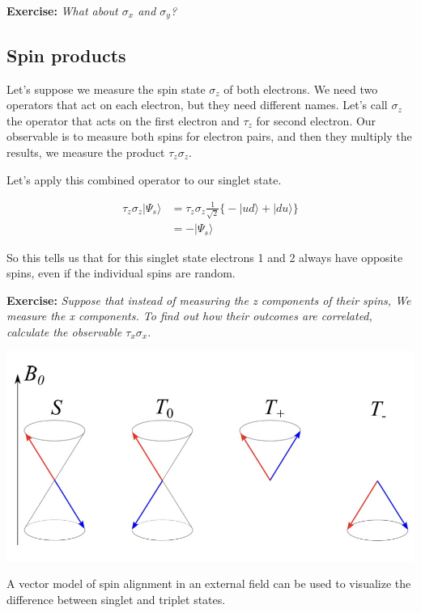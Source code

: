 \documentclass[]{tufte-handout}
\begin{document}
\textbf{Exercise:} \emph{What about \(\sigma_x\) and \(\sigma_y\)?}

\hypertarget{spin-products}{%
\subsection{Spin products}\label{spin-products}}

Let's suppose we measure the spin state \(\sigma_z\) of both electrons. We need two operators that act on each electron, but they need different names. Let's call \(\sigma_z\) the operator that acts on the first electron and \(\tau_z\) for second electron. Our observable is to measure both spins for electron pairs, and then they multiply the results, we measure the product \(\tau_z\sigma_z\).

Let's apply this combined operator to our singlet state.

\[
\begin{aligned}
\tau_z\sigma_z |\Psi_s\rangle &= \tau_z\sigma_z \frac{1}{\sqrt{2}} \Big\{ -|ud\rangle + |du\rangle \Big\} \\
&= - |\Psi_s\rangle
\end{aligned}
\]

So this tells us that for this singlet state electrons 1 and 2 always have opposite spins, even if the individual spins are random.

\textbf{Exercise:} \emph{Suppose that instead of measuring the z components of their spins, We measure the x components. To find out how their outcomes are correlated, calculate the observable \(\tau_x\sigma_x\)}.

\begin{marginfigure}

{\centering \includegraphics{img/vector_spinstates} 

}

\caption[A vector model of spin alignment in an external field can be used to visualize the difference between singlet and triplet states]{A vector model of spin alignment in an external field can be used to visualize the difference between singlet and triplet states.}\label{fig:unnamed-chunk-3}
\end{marginfigure}
\end{document}
